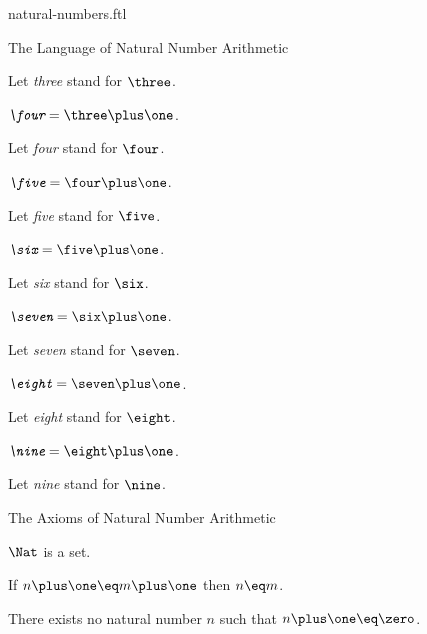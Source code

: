 \documentclass{naproche-library}
\begin{document}
\begin{smodule}[title=Natural Numbers]{natural-numbers.ftl}
\begin{sfragment}{The Language of Natural Number Arithmetic}
\begin{definition}[forthel,id=ThreeSig]
    Let \emph{three} stand for $\three$.
  \end{definition}

  \begin{definition}[forthel,id=FourSig]
    $\emph{\four}=\three\plus\one$.

    Let \emph{four} stand for $\four$.
  \end{definition}

  \begin{definition}[forthel,id=FiveSig]
    $\emph{\five}=\four\plus\one$.

    Let \emph{five} stand for $\five$.
  \end{definition}

  \begin{definition}[forthel,id=SixSig]
    $\emph{\six}=\five\plus\one$.

    Let \emph{six} stand for $\six$.
  \end{definition}

  \begin{definition}[forthel,id=SevenSig]
    $\emph{\seven}=\six\plus\one$.

    Let \emph{seven} stand for $\seven$.
  \end{definition}

  \begin{definition}[forthel,id=EightSig]
    $\emph{\eight}=\seven\plus\one$.

    Let \emph{eight} stand for $\eight$.
  \end{definition}

  \begin{definition}[forthel,id=NineSig]
    $\emph{\nine}=\eight\plus\one$.

    Let \emph{nine} stand for $\nine$.
  \end{definition}
\end{sfragment}

\begin{sfragment}{The Axioms of Natural Number Arithmetic}
  \begin{axiom}[forthel,title=Infinity Axiom,id=NatIsSetAx]
    $\Nat$ is a set.
  \end{axiom}

  \begin{axiom}[forthel,title=Peano Axiom I,id=PlusIsInjectiveAx]
    If $n\plus\one\eq m\plus\one$ then $n\eq m$.
  \end{axiom}
  \begin{axiom}[forthel,title=Peano Axiom II,id=ZeroIsNoSuccessorAx]
    There exists no natural number $n$ such that $n\plus\one\eq\zero$.
  \end{axiom}


\end{sfragment}
\end{smodule}
\end{document}
